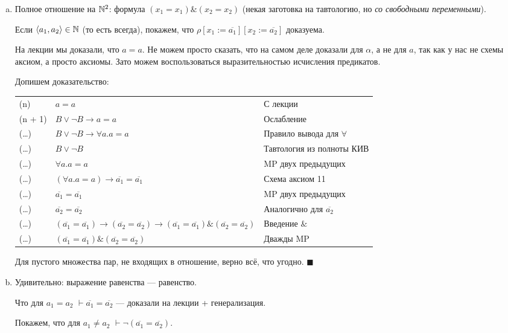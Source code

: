 \documentclass[12pt, a4paper]{article}
\begin{document}
\begin{enumerate}[(a)]
    \item Полное отношение на ${\mathbb{N}}^2$: формула $(x_1 = x_1) \& (x_2 = x_2)$
    (некая заготовка на тавтологию, но \textit{со свободными переменными}).
    
    Если $\langle a_1, a_2 \rangle \in {\mathbb{N}}$ (то есть всегда), покажем, что $\rho[x_1 := \overline{a_1}][x_2 := \overline{a_2}]$ доказуема.

    На лекции мы доказали, что $a = a$. Не можем просто сказать, что на самом деле доказали для $\alpha$, а не для $a$,
    так как у нас не схемы аксиом, а просто аксиомы. Зато можем воспользоваться выразительностью исчисления предикатов.

    Допишем доказательство:

    \begin{tabular}{lll}
        (n) & $a = a$ & С лекции \\
        (n + 1) & $B \vee \lnot B → a = a$ & Ослабление \\
        (…) & $B \vee \lnot B → \forall a. a = a$ & Правило вывода для $\forall$ \\
        (…) & $B \vee \lnot B$ & Тавтология из полноты КИВ \\
        (…) & $\forall a. a = a$ & MP двух предыдущих \\
        (…) & $(\forall a. a = a) → \overline{a_1} = \overline{a_1}$ & Схема аксиом 11 \\
        (…) & $\overline{a_1} = \overline{a_1}$ & MP двух предыдущих \\
        (…) & $\overline{a_2} = \overline{a_2}$ & Аналогично для $\overline{a_2}$ \\
        (…) & $(\overline{a_1} = \overline{a_1}) → (\overline{a_2} = \overline{a_2}) → (\overline{a_1} = \overline{a_1}) \& (\overline{a_2} = \overline{a_2})$ & Введение $\&$ \\
        (…) & $(\overline{a_1} = \overline{a_1}) \& (\overline{a_2} = \overline{a_2})$ & Дважды MP
    \end{tabular}

    Для пустого множества пар, не входящих в отношение, верно всё, что угодно. $\blacksquare$

    \item Удивительно: выражение равенства — равенство.
    
    Что для $a_1 = a_2$ $\vdash \overline{a_1} = \overline{a_2}$ — доказали на лекции + генерализация.

    Покажем, что для $a_1 \neq a_2$ $\vdash \lnot \left( \overline{a_1} = \overline{a_2} \right)$.


\end{enumerate}
\end{document}
